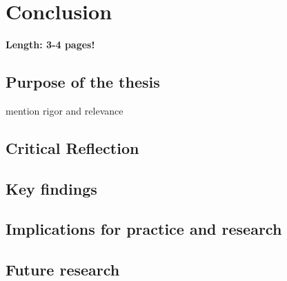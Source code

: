 \chapter{Conclusion}

\textbf{Length: 3-4 pages!}

\section{Purpose of the thesis} \label{sec:findings}

mention rigor and relevance

\section{Critical Reflection} \label{sec:Reflection}

\section{Key findings}

\section{Implications for practice and research} \label{Implications}

\section{Future research} \label{sec:FutureResearch}
